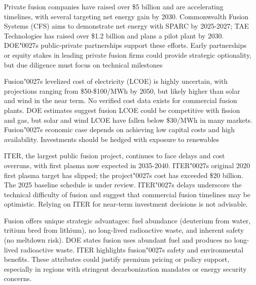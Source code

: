 \documentclass[10pt,a4paper]{article}
\newcommand{\BOApos}{{\BOQuoteFont\char"0027}}
\begin{document}
\begin{minipage}[t]{0.46\linewidth}
{\small Private fusion companies have raised over \$5 billion and are accelerating timelines, with several targeting net energy gain by 2030. Commonwealth Fusion Systems (CFS) aims to demonstrate net energy with SPARC by 2025-2027; TAE Technologies has raised over \$1.2 billion and plans a pilot plant by 2030. DOE\BOApos{}s public-private partnerships support these efforts. Early partnerships or equity stakes in leading private fusion firms could provide strategic optionality, but due diligence must focus on technical milestones}\par
{\small Fusion\BOApos{}s levelized cost of electricity (LCOE) is highly uncertain, with projections ranging from \$50-\$100/MWh by 2050, but likely higher than solar and wind in the near term. No verified cost data exists for commercial fusion plants. DOE estimates suggest fusion LCOE could be competitive with fission and gas, but solar and wind LCOE have fallen below \$30/MWh in many markets. Fusion\BOApos{}s economic case depends on achieving low capital costs and high availability. Investments should be hedged with exposure to renewables}\par
\end{minipage}\hfill\begin{minipage}[t]{0.46\linewidth}
{\small ITER, the largest public fusion project, continues to face delays and cost overruns, with first plasma now expected in 2035-2040. ITER\BOApos{}s original 2020 first plasma target has slipped; the project\BOApos{}s cost has exceeded \$20 billion. The 2025 baseline schedule is under review. ITER\BOApos{}s delays underscore the technical difficulty of fusion and suggest that commercial fusion timelines may be optimistic. Relying on ITER for near-term investment decisions is not advisable.}\par
{\small Fusion offers unique strategic advantages: fuel abundance (deuterium from water, tritium bred from lithium), no long-lived radioactive waste, and inherent safety (no meltdown risk). DOE states fusion uses abundant fuel and produces no long-lived radioactive waste. ITER highlights fusion\BOApos{}s safety and environmental benefits. These attributes could justify premium pricing or policy support, especially in regions with stringent decarbonization mandates or energy security concerns.}\par
\end{minipage}
\end{document}
